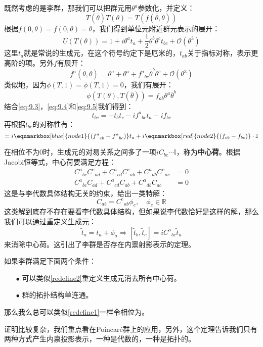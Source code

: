 既然考虑的是李群，那我们可以把群元用$\theta^a$参数化，并定义：
\[T(\bar\theta)T(\theta)=T\left(f(\bar\theta,\theta)\right)\]
根据$f(0,\theta)=f(0,\theta)=\theta$，我们得到单位元附近群元表示的展开：
\begin{equation}\label{eq:9.3}
	U\left(T(\theta)\right)=1+i\theta^a t_a+\frac{1}{2}\theta^b\theta^c t_{bc}+\mathcal{O}(\theta^3)
\end{equation}
这里$t_a$就是常说的生成元，在这个符号约定下是厄米的，$t_{ab}$关于指标对称，表示更高阶的项。另外$f$有展开：
\begin{equation}\label{eq:9.4}
	f^a(\bar\theta,\theta)=\theta^a+\theta^a+{f^a}_{bc}\bar\theta^b\theta^c+\mathcal{O}(\theta^3)
\end{equation}
类似地，因为$\phi(T,1)=\phi(T,1)=0$，我们有展开：
\begin{equation}\label{eq:9.5}
	\phi\left(T(\theta),T(\bar\theta)\right)=f_{ab}\theta^a\bar\theta^b
\end{equation}
结合\ref{eq:9.3}，\ref{eq:9.4}和\ref{eq:9.5}我们得到：
\begin{equation}
	t_{bc}=-t_bt_c-i{f^a}_{bc}t_a-if_{bc}
\end{equation}
再根据$t_{bc}$的对称性有：
\begin{equation}
	[t_b,t_c]=i\eqnmarkbox[blue]{node1}{\left({f^a}_{cb}-{f^a}_{bc}\right)}t_a+i\eqnmarkbox[red]{node2}{\left(f_{cb}-f_{bc}\right)}\cdot\mathbb{I}
\end{equation}

在相位不为0时，生成元的对易关系之间多了一项$iC_{bc}\cdots\mathbb{I}$，称为\textbf{中心荷}。根据Jacobi恒等式，中心荷要满足方程：
\begin{equation}
	\begin{aligned}
		{C^a}_{bc}{C^e}_{ad}+{C^a}_{cd}{C^e}_{ab}+{C^a}_{db}{C^e}_{ac}&=0\\
		{C^a}_{bc}{C}_{ad}+{C^a}_{cd}{C}_{ab}+{C^a}_{db}{C}_{ac}&=0
	\end{aligned}
\end{equation}
这是与李代数具体结构无关的约束，给出一类特解：
\[C_{ab}={C^e}_{ab}\phi_e,\quad\phi_e\in\mathbb{R}\]
这类解到底存不存在要看李代数具体结构，但如果说李代数恰好是这样的解，那么我们可以通过重定义生成元：
\begin{equation}\label{redefine2}
	\tilde t_a=t_a+\phi_a\Rightarrow [\tilde t_b,\tilde t_c]=i{C^a}_{bc}\tilde t_a
\end{equation}
来消除中心荷。这引出了李群是否存在内禀射影表示的定理。
\begin{theorem}
	如果李群满足下面两个条件：
	\begin{itemize}
		\item[$\bullet$] 可以类似\ref{redefine2}重定义生成元消去所有中心荷。
		\item[$\bullet$] 群的拓扑结构单连通。
	\end{itemize}
	那么我么总可以类似\ref{redefine1}一样令相位为。
\end{theorem}
证明比较复杂，我们重点看在Poincar\'e群上的应用，另外，这个定理告诉我们只有两种方式产生内禀投影表示，一种是代数的，一种是拓扑的。


